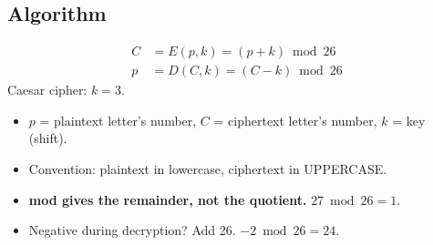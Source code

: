 \documentclass[10pt,a4paper]{article}
\begin{document}
\subsection{Algorithm}
\begin{minipage}[c]{0.55\textwidth}
\begin{keybox}[title=Encryption and decryption]
\vspace{-6pt}
\begin{align*}
C &= E(p,k) = (p + k) \bmod 26\\
p &= D(C,k) = (C - k) \bmod 26
\end{align*}
Caesar cipher: $k = 3$.
\end{keybox}
\begin{itemize}
  \item $p$ = plaintext letter's number, $C$ = ciphertext letter's number, $k$ = key (shift).
  \item Convention: plaintext in lowercase, ciphertext in UPPERCASE.
  \item \textbf{mod gives the remainder, not the quotient.} $27 \bmod 26 = 1$.
  \item Negative during decryption? Add 26. \;$-2 \bmod 26 = 24$.
\end{itemize}
\end{minipage}\hfill
\begin{minipage}[c]{0.42\textwidth}
\centering
{}
\end{minipage}
\end{document}
